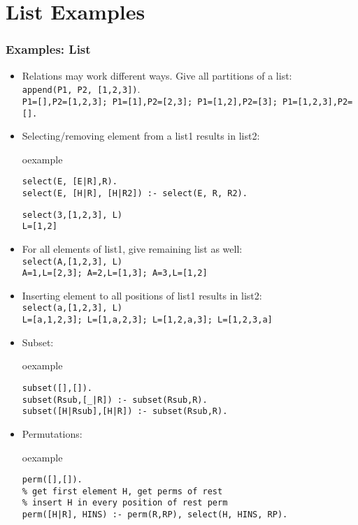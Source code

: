 \section{List Examples}
\begin{frame}[fragile]
\frametitle{Examples: List}
\begin{itemize}
\item Relations may work different ways. Give all partitions of a list:\\
\lstinline!append(P1, P2, [1,2,3])!. \\
\lstinline[basicstyle=\tiny\ttfamily]!P1=[],P2=[1,2,3]; P1=[1],P2=[2,3]; P1=[1,2],P2=[3]; P1=[1,2,3],P2=[].!
\item Selecting/removing element from a list1 results in list2:\\
\begin{beamercolorbox}{oexample}
\begin{lstlisting}
select(E, [E|R],R).
select(E, [H|R], [H|R2]) :- select(E, R, R2).
\end{lstlisting}
\end{beamercolorbox}
\lstinline!select(3,[1,2,3], L)!\\
\lstinline!L=[1,2]!\\
\item For all elements of list1, give remaining list as well:\\
\lstinline!select(A,[1,2,3], L)!\\
\lstinline!A=1,L=[2,3]; A=2,L=[1,3]; A=3,L=[1,2]!
\item Inserting element to all positions of list1 results in list2:\\
\lstinline!select(a,[1,2,3], L)!\\
\lstinline[basicstyle=\scriptsize\ttfamily]!L=[a,1,2,3]; L=[1,a,2,3]; L=[1,2,a,3]; L=[1,2,3,a]! 
\end{itemize}
\end{frame}

\begin{frame}[fragile]
\begin{itemize}
\item Subset:\\
\begin{beamercolorbox}{oexample}
\begin{lstlisting}[escapeinside=`']
subset([],[]).
subset(Rsub,[_|R]) :- subset(Rsub,R).
subset([H|Rsub],[H|R]) :- subset(Rsub,R).
\end{lstlisting}
\end{beamercolorbox}
\item Permutations:\\
\begin{beamercolorbox}{oexample}
\begin{lstlisting}[escapeinside=`']
% insert H to all positions in the remainder permutations
perm([],[]).
% get first element H, get perms of rest
% insert H in every position of rest perm
perm([H|R], HINS) :- perm(R,RP), select(H, HINS, RP).
\end{lstlisting}
\end{beamercolorbox}
\end{itemize}
\end{frame}

